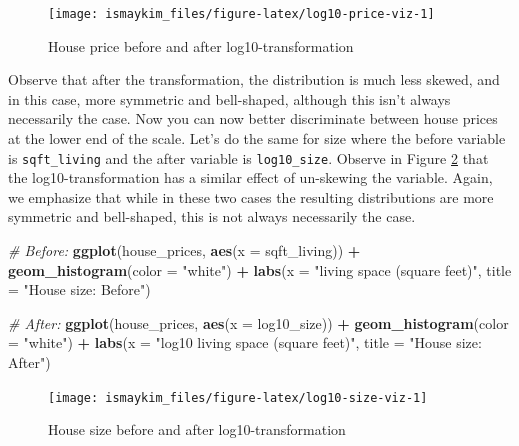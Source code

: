 \documentclass[12pt,]{krantz}
\makeatletter
\newenvironment{Shaded}{\begin{snugshade}}{\end{snugshade}}
\newcommand{\KeywordTok}[1]{\textcolor[rgb]{0.27,0.27,0.27}{\textbf{#1}}}
\newcommand{\DataTypeTok}[1]{\textcolor[rgb]{0.27,0.27,0.27}{#1}}
\newcommand{\StringTok}[1]{\textcolor[rgb]{0.5,0.5,0.5}{#1}}
\newcommand{\CommentTok}[1]{\textcolor[rgb]{0.37,0.37,0.37}{\textit{#1}}}
\newcommand{\OperatorTok}[1]{\textcolor[rgb]{0.43,0.43,0.43}{\textbf{#1}}}
\newcommand{\NormalTok}[1]{#1}
\newenvironment{kframe}{%
\medskip{}
\setlength{\fboxsep}{.8em}
 \def\at@end@of@kframe{}%
 \ifinner\ifhmode%
  \def\at@end@of@kframe{\end{minipage}}%
  \begin{minipage}{\columnwidth}%
 \fi\fi%
 \def\FrameCommand##1{\hskip\@totalleftmargin \hskip-\fboxsep
 \colorbox{shadecolor}{##1}\hskip-\fboxsep
     \hskip-\linewidth \hskip-\@totalleftmargin \hskip\columnwidth}%
 \MakeFramed {\advance\hsize-\width
   \@totalleftmargin\z@ \linewidth\hsize
   \@setminipage}}%
 {\par\unskip\endMakeFramed%
 \at@end@of@kframe}
\renewenvironment{Shaded}{\begin{kframe}}{\end{kframe}}
\makeatother
\begin{document}
\begin{figure}

{\centering \texttt{[image: ismaykim\_files/figure-latex/log10-price-viz-1]} 

}

\caption{House price before and after log10-transformation}\label{fig:log10-price-viz}
\end{figure}

Observe that after the transformation, the distribution is much less
skewed, and in this case, more symmetric and bell-shaped, although this
isn't always necessarily the case. Now you can now better discriminate
between house prices at the lower end of the scale. Let's do the same
for size where the before variable is \texttt{sqft\_living} and the
after variable is \texttt{log10\_size}. Observe in Figure
\ref{fig:log10-size-viz} that the log10-transformation has a similar
effect of un-skewing the variable. Again, we emphasize that while in
these two cases the resulting distributions are more symmetric and
bell-shaped, this is not always necessarily the case.

\begin{Shaded}
\begin{Highlighting}[]
\CommentTok{# Before:}
\KeywordTok{ggplot}\NormalTok{(house_prices, }\KeywordTok{aes}\NormalTok{(}\DataTypeTok{x =}\NormalTok{ sqft_living)) }\OperatorTok{+}
\StringTok{  }\KeywordTok{geom_histogram}\NormalTok{(}\DataTypeTok{color =} \StringTok{"white"}\NormalTok{) }\OperatorTok{+}
\StringTok{  }\KeywordTok{labs}\NormalTok{(}\DataTypeTok{x =} \StringTok{"living space (square feet)"}\NormalTok{, }\DataTypeTok{title =} \StringTok{"House size: Before"}\NormalTok{)}

\CommentTok{# After:}
\KeywordTok{ggplot}\NormalTok{(house_prices, }\KeywordTok{aes}\NormalTok{(}\DataTypeTok{x =}\NormalTok{ log10_size)) }\OperatorTok{+}
\StringTok{  }\KeywordTok{geom_histogram}\NormalTok{(}\DataTypeTok{color =} \StringTok{"white"}\NormalTok{) }\OperatorTok{+}
\StringTok{  }\KeywordTok{labs}\NormalTok{(}\DataTypeTok{x =} \StringTok{"log10 living space (square feet)"}\NormalTok{, }\DataTypeTok{title =} \StringTok{"House size: After"}\NormalTok{)}
\end{Highlighting}
\end{Shaded}

\begin{figure}

{\centering \texttt{[image: ismaykim\_files/figure-latex/log10-size-viz-1]} 

}

\caption{House size before and after log10-transformation}\label{fig:log10-size-viz}
\end{figure}
\end{document}
